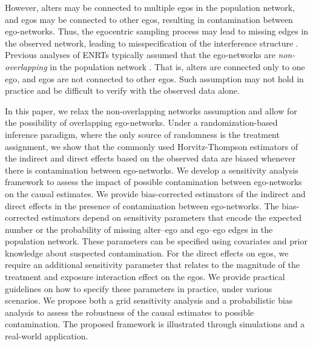 \documentclass[11pt]{article}
\theoremstyle{definition}
\begin{document}
However, alters may be connected to multiple egos in the population network,
and egos may be connected to other egos, resulting in contamination between ego-networks.
Thus, the egocentric sampling process may lead to missing edges in the observed network,
    leading to misspecification of the interference structure \citep{Weinstein2023}.
Previous analyses of ENRTs typically assumed that the ego-networks
are \emph{non-overlapping} in the population network \citep{Buchanan2018,Buchanan_2024,Chao2023,Fang2023}.
That is, alters are connected only to one ego, and egos are not connected to other egos.
Such assumption may not hold in practice and be difficult to verify with the observed data alone.

In this paper, we relax the non-overlapping networks assumption and allow for the possibility of overlapping ego-networks.
Under a randomization-based inference paradigm, where the only source of randomness is the treatment assignment,
 we show that the commonly used Horvitz-Thompson estimators of the indirect and direct effects
 based on the observed data are biased whenever there is contamination between ego-networks.
We develop a sensitivity analysis framework to assess the impact of possible contamination between ego-networks on the causal estimates.
We provide bias-corrected estimators of the indirect and direct effects in the presence of contamination
between ego-networks.
The bias-corrected estimators depend on sensitivity parameters that encode 
the expected number or the probability of missing alter--ego and ego--ego edges in the population network.
These parameters can be specified using covariates and prior knowledge about suspected contamination. 
For the direct effects on egos, we require an additional sensitivity parameter
that relates to the magnitude of the treatment and exposure interaction effect on the egos.
We provide practical guidelines on how to specify these parameters in practice,
under various scenarios.
We propose both a grid sensitivity analysis \citep{greenland1996basic,rosenbaum2005sensitivity}
 and a probabilistic bias analysis \citep{Greenland2005,Lash2014,Fox2021}
to assess the robustness of the causal estimates to possible contamination.
The proposed framework is illustrated through simulations and a real-world application.
\end{document}
